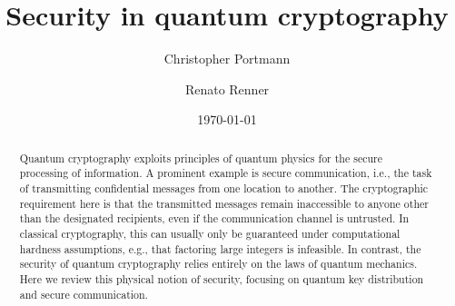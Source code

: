 \documentclass[rmp,aps,reprint,longbibliography]{revtex4-1}
\begin{document}
\title{Security in quantum cryptography}

\author{Christopher Portmann}

\author{Renato Renner}


\date{\today}


\begin{abstract}
  Quantum cryptography exploits principles of quantum physics for the secure processing of information.   A prominent example is secure communication, i.e., the task of transmitting confidential messages from one location to another. The cryptographic requirement here is that the transmitted messages remain inaccessible to anyone other than the designated recipients, even if the communication channel is untrusted. In classical cryptography, this can usually only be guaranteed under computational hardness assumptions, e.g., that factoring large integers is infeasible. In contrast, the security of quantum cryptography relies entirely on the laws of quantum mechanics.  Here we review this physical notion of security, focusing on quantum key distribution and secure communication.
\end{abstract}



\maketitle

\tableofcontents
















\end{document}

